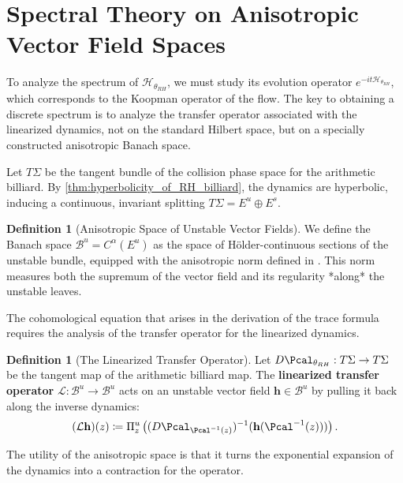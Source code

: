 \documentclass[12pt, letterpaper]{amsart}
\theoremstyle{plain}
\theoremstyle{definition}
\newtheorem{definition}[theorem]{Definition}
\theoremstyle{remark}
\newcommand{\Ecalu}{E^u}
\newcommand{\Ecals}{E^s}
\newcommand{\BcalUnstable}{\mathcal{B}^u}
\newcommand{\LcalOp}{\mathcal{L}}
\newcommand{\hvec}{\mathbf{h}}
\newcommand{\PiUnstable}{\Pi^u}
\begin{document}
\section{Spectral Theory on Anisotropic Vector Field Spaces}
\label{sec:spectral_theory}

To analyze the spectrum of $\mathcal{H}_{\theta_{RH}}$, we must study its evolution operator $e^{-it\mathcal{H}_{\theta_{RH}}}$, which corresponds to the Koopman operator of the flow. The key to obtaining a discrete spectrum is to analyze the transfer operator associated with the linearized dynamics, not on the standard Hilbert space, but on a specially constructed anisotropic Banach space.

Let $T\Sigma$ be the tangent bundle of the collision phase space for the arithmetic billiard. By \cref{thm:hyperbolicity_of_RH_billiard}, the dynamics are hyperbolic, inducing a continuous, invariant splitting $T\Sigma = \Ecalu \oplus \Ecals$.

\begin{definition}[Anisotropic Space of Unstable Vector Fields]
We define the Banach space $\BcalUnstable = C^\alpha(\Ecalu)$ as the space of Hölder-continuous sections of the unstable bundle, equipped with the anisotropic norm defined in \cite{Qi2025-Strategy}. This norm measures both the supremum of the vector field and its regularity *along* the unstable leaves.
\end{definition}

The cohomological equation that arises in the derivation of the trace formula requires the analysis of the transfer operator for the linearized dynamics.

\begin{definition}[The Linearized Transfer Operator]
Let $D\Pcal_{\theta_{RH}}: T\Sigma \to T\Sigma$ be the tangent map of the arithmetic billiard map. The \textbf{linearized transfer operator} $\LcalOp: \BcalUnstable \to \BcalUnstable$ acts on an unstable vector field $\hvec \in \BcalUnstable$ by pulling it back along the inverse dynamics:
\begin{equation}
    (\LcalOp \hvec)(z) \coloneqq \PiUnstable_z \left( (D\Pcal_{\Pcal^{-1}(z)})^{-1} (\hvec(\Pcal^{-1}(z))) \right).
\end{equation}
\end{definition}

The utility of the anisotropic space is that it turns the exponential expansion of the dynamics into a contraction for the operator.
\end{document}
